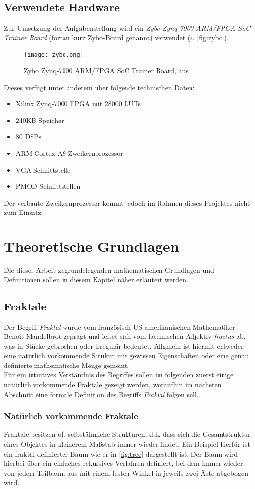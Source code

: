 \documentclass[a4paper,12pt,onesided]{report}
\begin{document}
\section{Verwendete Hardware}
\label{sec:zybo-specs}
Zur Umsetzung der Aufgabenstellung wird ein \textit{Zybo Zynq-7000 ARM/FPGA SoC Trainer Board} (fortan kurz Zybo-Board genannt) verwendet (s. \autoref{fig:zybo}).
\begin{figure}[H]
	\centering
	\texttt{[image: zybo.png]}
	\caption{Zybo Zynq-7000 ARM/FPGA SoC Trainer Board, aus }
	\label{fig:zybo}
\end{figure}
Dieses verfügt unter anderem über folgende technischen Daten:
\begin{itemize}
	\item Xilinx Zynq-7000 FPGA mit 28000 LUTs
	\item 240KB Speicher
	\item 80 DSPs
	\item ARM Cortex-A9 Zweikernprozessor
	\item VGA-Schnittstelle
	\item PMOD-Schnittstellen
\end{itemize}
Der verbaute Zweikernprozessor kommt jedoch im Rahmen dieses Projektes nicht zum Einsatz.

\chapter{Theoretische Grundlagen}
Die dieser Arbeit zugrundelegenden mathematischen Grundlagen und Definitionen sollen in diesem Kapitel näher erläutert werden.

\section{Fraktale}
Der Begriff \textit{Fraktal} wurde vom französisch-US-amerikanischen Mathematiker Benoît Mandelbrot geprägt und leitet sich vom lateinischen Adjektiv \textit{fractus} ab, was \glqq in Stücke gebrochen\grqq{} oder \glqq irregulär\grqq{} bedeutet. Allgmein ist hiermit entweder eine natürlich vorkommende Strukur mit gewissen Eigenschaften oder eine genau definierte mathematische Menge gemeint. \cite[S. 16]{mandelbrot2013fraktale}\\
Für ein intuitives Verständnis des Begriffes sollen im folgenden zuerst einige natürlich vorkommende Fraktale gezeigt werden, woraufhin im nächsten Abschnitt eine formale Definition des Begriffs \textit{Fraktal} folgen soll.

\subsection{Natürlich vorkommende Fraktale}
\label{sec:natfrac}
Fraktale besitzen oft selbstähnliche Strukturen, d.h. dass sich die Gesamtstruktur eines Objektes in kleinerem Maßstab immer wieder findet. Ein Beispiel hierfür ist ein fraktal definierter Baum wie er in \autoref{fig:tree} dargestellt ist. Der Baum wird hierbei über ein einfaches rekursives Verfahren definiert, bei dem immer wieder von jedem Teilbaum aus mit einem festen Winkel in jeweils zwei Äste abgebogen wird.
\end{document}
